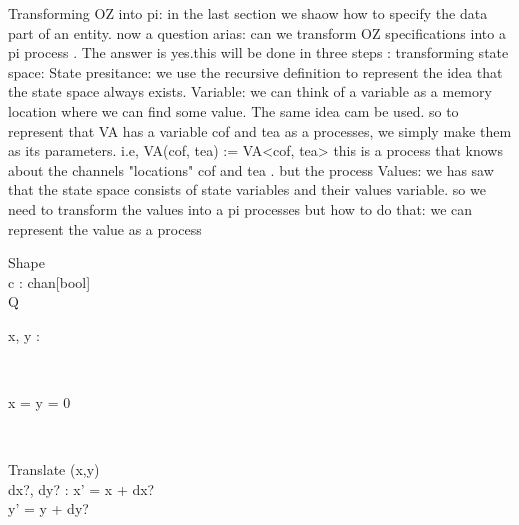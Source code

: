 Transforming OZ into pi:
in the last section we shaow how to specify the data part of an entity. now a question arias: can we transform OZ specifications into a pi process . The answer is yes.this will be done in three steps :
transforming state space:
State presitance: we use the recursive definition to represent the idea that the state space always exists.
Variable: we can think of a variable as a memory location where we can find some value. The same idea cam be used. so to represent that VA has a variable cof and tea  as a processes, we simply make them as its parameters. i.e, VA(cof, tea) := VA<cof, tea> this is a process that knows about the channels "locations" cof and tea . but the process
Values: we has saw that the state space consists  of state variables and their values variable. so we need to transform the values into a pi processes but how to do that:
we can represent the value as a process 
\begin{class}{Shape}
\\c : chan[bool]
\\Q{}
\\
\begin{state}
x, y : \real
\end{state} 
\\
\begin{init}
x = y = 0
\end{init} 
\\
\begin{op}{Translate}
\Delta (x,y)
\\
dx?, dy? : \real
\ST
x' = x + dx?
\\y' = y + dy?
\end{op}\end{class}
\newpage %
